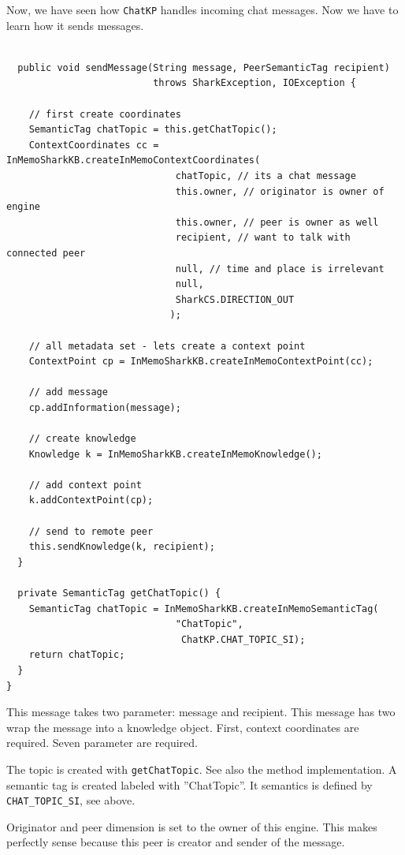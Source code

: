 {Now, we have seen how {\tt ChatKP} handles incoming chat messages. Now we have to learn how it sends messages.

\begin{verbatim}

  public void sendMessage(String message, PeerSemanticTag recipient)
                          throws SharkException, IOException {

    // first create coordinates
    SemanticTag chatTopic = this.getChatTopic();
    ContextCoordinates cc = InMemoSharkKB.createInMemoContextCoordinates(
                              chatTopic, // its a chat message
                              this.owner, // originator is owner of engine
                              this.owner, // peer is owner as well
                              recipient, // want to talk with connected peer
                              null, // time and place is irrelevant
                              null,
                              SharkCS.DIRECTION_OUT
                             );

    // all metadata set - lets create a context point
    ContextPoint cp = InMemoSharkKB.createInMemoContextPoint(cc);

    // add message
    cp.addInformation(message);

    // create knowledge
    Knowledge k = InMemoSharkKB.createInMemoKnowledge();

    // add context point
    k.addContextPoint(cp);

    // send to remote peer
    this.sendKnowledge(k, recipient);
  }

  private SemanticTag getChatTopic() {
    SemanticTag chatTopic = InMemoSharkKB.createInMemoSemanticTag(
                              "ChatTopic",
                               ChatKP.CHAT_TOPIC_SI);
    return chatTopic;
  }
}
\end{verbatim}

This message takes two parameter: message and recipient. This message has two wrap the message into a knowledge object. First, context coordinates are required. Seven parameter are required.

The topic is created with {\tt getChatTopic}. See also the method implementation. A semantic tag is created labeled with ''ChatTopic''. It semantics is defined by {\tt CHAT\_TOPIC\_SI}, see above.

Originator and peer dimension is set to the owner of this engine. This makes
perfectly sense because this peer is creator and sender of the message.

}
